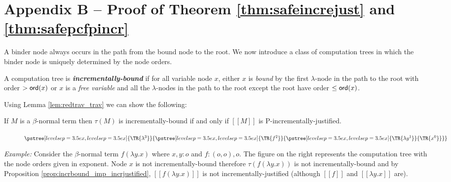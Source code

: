 \documentclass{llncs}
\newcommand\defname[1]{{\bf\em #1}\index{#1}}
\newcommand\ord[1]{{\sf ord}(#1)}
\newcommand{\sem}[1]{{[\![ #1 ]\!]}}
\newcommand{\tree}[2][levelsep=3.5ex]{\pstree[levelsep=3.5ex,#1]{\TR{#2}}}
\begin{document}
\section*{Appendix B -- Proof of Theorem \ref{thm:safeincrejust} and \ref{thm:safepcfpincr}}
A binder node always occurs in the path from the bound node to the root.
We now introduce a class of computation trees in which the binder node is uniquely determined by the node orders.
\begin{definition}
A computation tree is \defname{incrementally-bound} if for 
all variable node $x$, either
$x$ is \emph{bound} by the first $\lambda$-node in the path to the root with order $> \ord{x}$
or $x$ is a \emph{free variable} and all the $\lambda$-nodes in the path to the root except the root have order $\leq \ord{x}$.
\end{definition}

Using Lemma \ref{lem:redtrav_trav} we can show the following:
\begin{proposition} %
\label{prop:incrbound_imp_incrjustified}
If $M$ is a $\beta$-normal term then
$\tau(M)$ is incrementally-bound if and only if $\sem{M}$
is P-incrementally-justified.
\end{proposition}


\begin{wrapfigure}[5]{r}{0.6cm}
$%
{\tree{\lambda^3}{\tree{f^2}{ \tree{\lambda y^1}{ \TR{x^0} }}}}$
\end{wrapfigure}
\noindent \emph{Example:} %
Consider the $\beta$-normal term $f (\lambda y .x)$ where $x,y:o$ and $f:(o,o),o$. The figure on
the right represents the computation tree with the node orders given in exponent.
Node $x$ is not incrementally-bound therefore $\tau(f (\lambda y .x))$ is not incrementally-bound and
by Proposition \ref{prop:incrbound_imp_incrjustified}, $\sem{f (\lambda
y .x)}$ is not incrementally-justified (although $\sem{f}$ and $\sem{\lambda y. x}$ are).
\end{document}
